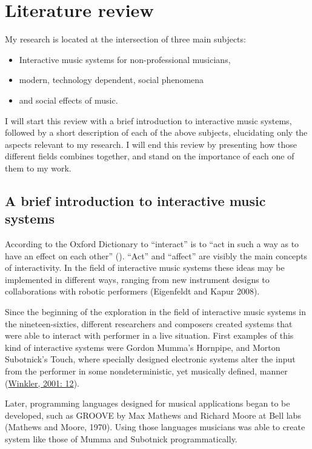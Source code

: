\section{Literature review}

My research is located at the intersection of three main subjects:
\begin{itemize}
	\item Interactive music systems for non-professional musicians,
	\item modern, technology dependent, social phenomena
	\item and social effects of music.
\end{itemize}
I will start this review with a brief introduction to interactive music systems, followed by a short description of each of the above subjects, elucidating only the aspects relevant to my research. I will end this review by presenting how those different fields combines together, and stand on the importance of each one of them to my work.

\subsection{A brief introduction to interactive music systems}

According to the Oxford Dictionary to ``interact'' is to ``act in such a way as to have an effect on each other'' (). ``Act'' and ``affect'' are visibly the main concepts of interactivity. In the field of interactive music systems these ideas may be implemented in different ways, ranging from new instrument designs to collaborations with robotic performers (Eigenfeldt and Kapur 2008).

Since the beginning of the exploration in the field of interactive music systems in the nineteen-sixties, different researchers and composers created systems that were able to interact with performer in a live situation. First examples of this kind of interactive systems were Gordon Mumma's Hornpipe, and Morton Subotnick's Touch, where specially designed electronic systems alter the input from the performer in some nondeterministic, yet musically defined, manner (\href{http://blog.lib.umn.edu/geers001/emusic/14_assig_ComposingInteractiveMusicCh1-2.pdf}{Winkler, 2001: 12}).

Later, programming languages designed for musical applications began to be developed, such as GROOVE by Max Mathews and Richard Moore at Bell labs (Mathews and Moore, 1970). Using those languages musicians was able to create system like those of Mumma and Subotnick programmatically.


